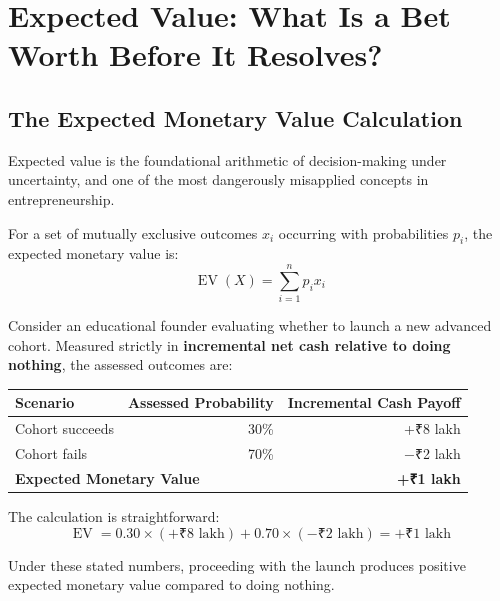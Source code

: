 \section{Expected Value: What Is a Bet Worth Before It Resolves?}

\subsection{The Expected Monetary Value Calculation}

Expected value is the foundational arithmetic of decision-making under uncertainty, and one of the most dangerously misapplied concepts in entrepreneurship.

For a set of mutually exclusive outcomes $x_i$ occurring with probabilities $p_i$, the expected monetary value is:
\begin{equation}
\operatorname{EV}(X) = \sum_{i=1}^n p_i x_i
\end{equation}

Consider an educational founder evaluating whether to launch a new advanced cohort. Measured strictly in \textbf{incremental net cash relative to doing nothing}, the assessed outcomes are:

\begin{tcolorbox}[
  enhanced,
  colback=BayesSurface!60,
  colframe=BayesBorder,
  boxrule=0.5pt,
  arc=3pt,
  left=3pt,right=3pt,top=3pt,bottom=3pt,
  boxsep=1pt
]
\scriptsize
\begin{tabularx}{\linewidth}{X r r}
\toprule
\textbf{Scenario} & \textbf{Assessed Probability} & \textbf{Incremental Cash Payoff} \\
\midrule
Cohort succeeds & 30\% & +₹8 lakh \\
Cohort fails & 70\% & $-$₹2 lakh \\
\midrule
\multicolumn{2}{l}{\textbf{Expected Monetary Value}} & \textbf{+₹1 lakh} \\
\bottomrule
\end{tabularx}
\end{tcolorbox}

The calculation is straightforward:
\begin{equation*}
\operatorname{EV} = 0.30 \times (+\text{₹}8\text{ lakh}) + 0.70 \times (-\text{₹}2\text{ lakh}) = +\text{₹}1\text{ lakh}
\end{equation*}

Under these stated numbers, proceeding with the launch produces positive expected monetary value compared to doing nothing.

